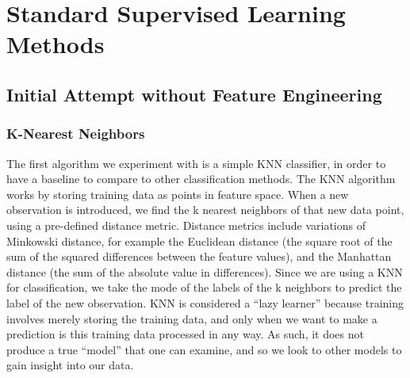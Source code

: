 \documentclass{article}
\begin{document}


\section{Standard Supervised Learning Methods}
\label{standard_ML}

\subsection{Initial Attempt without Feature Engineering}

\subsubsection{K-Nearest Neighbors}
The first algorithm we experiment with is a simple KNN classifier, in order to have a baseline to compare to other classification methods. The KNN algorithm works by storing training data as points in feature space. When a new observation is introduced, we find the k nearest neighbors of that new data point, using a pre-defined distance metric. Distance metrics include variations of Minkowski distance, for example the Euclidean distance (the square root of the sum of the squared differences between the feature values), and the Manhattan distance (the sum of the absolute value in differences). Since we are using a KNN for classification, we take the mode of the labels of the k neighbors to predict the label of the new observation. KNN is considered a “lazy learner” because training involves merely storing the training data, and only when we want to make a prediction is this training data processed in any way. As such, it does not produce a true ``model” that one can examine, and so we look to other models to gain insight into our data. 
\end{document}
